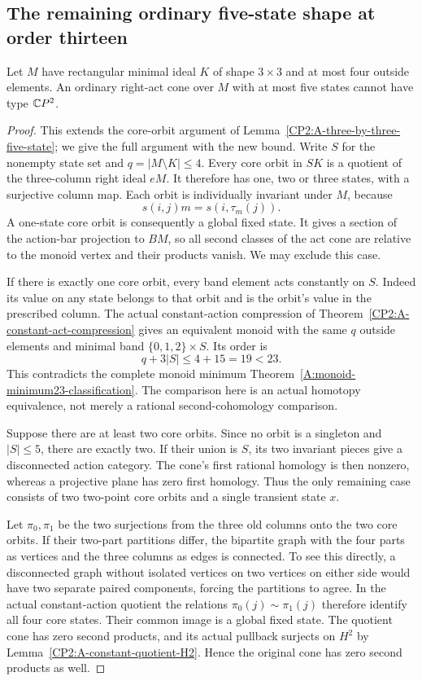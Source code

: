 \subsection{The remaining ordinary five-state shape at order thirteen}

\begin{proposition}
\label{CP2:A-three-by-three-four-outside-five-state}
Let $M$ have rectangular minimal ideal $K$ of shape $3\times3$
and at most four outside elements. An ordinary right-act cone
over $M$ with at most five states cannot have type $\mathbb{C}P^2$.
\end{proposition}
\begin{proof}
This extends the core-orbit argument of
Lemma~\ref{CP2:A-three-by-three-five-state}; we give the full
argument with the new bound. Write $S$ for the nonempty state
set and $q=|M\setminus K|\leq4$. Every core orbit in $SK$ is
a quotient of the three-column right ideal $eM$. It therefore
has one, two or three states, with a surjective column map.
Each orbit is individually invariant under $M$, because
\[
 s(i,j)m=s(i,\tau_m(j)).
\]
A one-state core orbit is consequently a global fixed state.
It gives a section of the action-bar projection to $BM$, so
all second classes of the act cone are relative to the monoid
vertex and their products vanish. We may exclude this case.

If there is exactly one core orbit, every band element acts
constantly on $S$. Indeed its value on any state belongs to
that orbit and is the orbit's value in the prescribed column.
The actual constant-action compression of
Theorem~\ref{CP2:A-constant-act-compression} gives an equivalent
monoid with the same $q$ outside elements and minimal band
$\{0,1,2\}\times S$. Its order is
\[
 q+3|S|\leq4+15=19<23.
\]
This contradicts the complete monoid minimum
Theorem~\ref{A:monoid-minimum23-classification}. The comparison
here is an actual homotopy equivalence, not merely a rational
second-cohomology comparison.

Suppose there are at least two core orbits. Since no orbit is
a singleton and $|S|\leq5$, there are exactly two. If their
union is $S$, its two invariant pieces give a disconnected
action category. The cone's first rational homology is then
nonzero, whereas a projective plane has zero first homology.
Thus the only remaining case consists of two two-point core
orbits and a single transient state $x$.

Let $\pi_0,\pi_1$ be the two surjections from the three old
columns onto the two core orbits. If their two-part partitions
differ, the bipartite graph with the four parts as vertices
and the three columns as edges is connected. To see this
directly, a disconnected graph without isolated vertices on
two vertices on either side would have two separate paired
components, forcing the partitions to agree. In the actual
constant-action quotient the relations
$\pi_0(j)\sim\pi_1(j)$ therefore identify all four core states.
Their common image is a global fixed state. The quotient cone
has zero second products, and its actual pullback surjects on
$H^2$ by Lemma~\ref{CP2:A-constant-quotient-H2}. Hence the original
cone has zero second products as well.


\end{proof}
